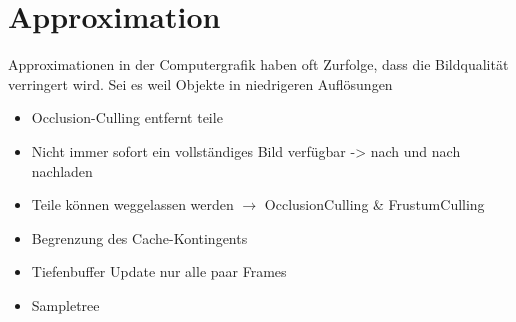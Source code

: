 \section{Approximation}
\label{sec:basics:approximation}
Approximationen in der Computergrafik haben oft  Zurfolge, dass die Bildqualität verringert wird. Sei es weil Objekte in niedrigeren Auflösungen
\begin{itemize}
 \item Occlusion-Culling entfernt teile
 \item Nicht immer sofort ein vollständiges Bild verfügbar -> nach und nach nachladen
 \item Teile können weggelassen werden $\rightarrow$ OcclusionCulling \& FrustumCulling
 \item Begrenzung des Cache-Kontingents
 \item Tiefenbuffer Update nur alle paar Frames
 \item Sampletree
\end{itemize}
